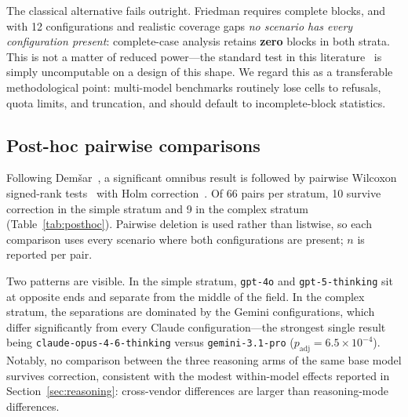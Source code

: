\documentclass[conference]{IEEEtran}
\begin{document}
The classical alternative fails outright. Friedman requires complete blocks, and
with 12 configurations and realistic coverage gaps \emph{no scenario has every
configuration present}: complete-case analysis retains \textbf{zero} blocks in
both strata. This is not a matter of reduced power---the standard test in this
literature~\cite{demsar2006statistical} is simply uncomputable on a design of
this shape. We regard this as a transferable methodological point: multi-model
benchmarks routinely lose cells to refusals, quota limits, and truncation, and
should default to incomplete-block statistics.

\subsection{Post-hoc pairwise comparisons}
\label{sec:posthoc}
Following Dem\v{s}ar~\cite{demsar2006statistical}, a significant omnibus result is
followed by pairwise Wilcoxon signed-rank tests~\cite{wilcoxon1945individual}
with Holm correction~\cite{holm1979simple}. Of 66 pairs per stratum, 10 survive
correction in the simple stratum and 9 in the complex stratum
(Table~\ref{tab:posthoc}). Pairwise deletion is used rather than listwise, so
each comparison uses every scenario where both configurations are present; $n$ is
reported per pair.

Two patterns are visible. In the simple stratum, \texttt{gpt-4o} and
\texttt{gpt-5-thinking} sit at opposite ends and separate from the middle of the
field. In the complex stratum, the separations are dominated by the Gemini
configurations, which differ significantly from every Claude configuration---the
strongest single result being \texttt{claude-opus-4-6-thinking} versus
\texttt{gemini-3.1-pro} ($p_{\text{adj}}=6.5\times10^{-4}$). Notably, no
comparison between the three reasoning arms of the same base model survives
correction, consistent with the modest within-model effects reported in
Section~\ref{sec:reasoning}: cross-vendor differences are larger than
reasoning-mode differences.
\end{document}
